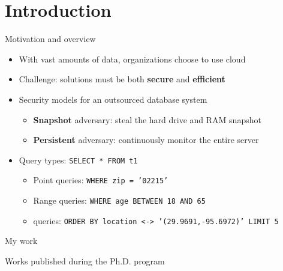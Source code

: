\section{Introduction}

	\begin{frame}{Motivation and overview}

		\begin{itemize}
			\item<1-> With vast amounts of data, organizations choose to use cloud
			\item<1-> \alert{Challenge:} solutions must be both \textbf{secure} and \textbf{efficient}
			\item<2-> Security models for an outsourced database system
				\begin{itemize}
					\item<1,2-> \textbf{Snapshot} adversary: steal the hard drive and RAM snapshot
					\item<1,3-> \textbf{Persistent} adversary: continuously monitor the entire server
				\end{itemize}
			\item<4-> Query types: \texttt{SELECT * FROM t1 }
				\begin{itemize}
					\item<1-3,4-> Point queries: \texttt{WHERE zip = '02215'} %
					\item<1-3,5-> Range queries: \texttt{WHERE age BETWEEN 18 AND 65} %
					\item<1-3,6-> \knn{} queries: \texttt{ORDER BY location <-> '(29.9691,-95.6972)' LIMIT 5} %
				\end{itemize}
		\end{itemize}

	\end{frame}

	\newlength{\citationLength}

	\begin{frame}{My work}

		\begin{block}{Works published during the Ph.D. program}

			\vspace*{1ex}

			\begin{description}[
				leftmargin=\dimexpr\citationLength+0.5em\relax,
				labelindent=0pt,
				labelwidth=\citationLength%
			]
				\setlength\itemsep{1ex}
				\item<1>[\cite{ore-benchmark-17}] 
				\item<2>[\cite{epsolute}] 
				\item<3>[\cite{k-anon}] 
				\item<4>[\cite{bogatov-idemix-2020}] 
			\end{description}

		\end{block}

	\end{frame}
